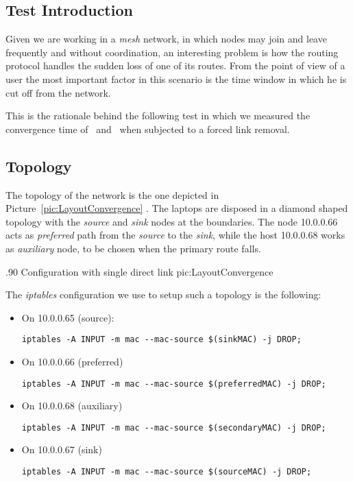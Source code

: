 \subsection{Test Introduction}
Given we are working in a \emph{mesh} network, in which nodes may join
and leave frequently and without coordination, an interesting problem
is how the routing protocol handles the sudden loss of one of its
routes. From the point of view of a user the most important factor in
this scenario is the time window in which he is cut off from the
network.

This is the rationale behind the following test in which we measured the
convergence time of \batman\ and \olsr\ when subjected to a forced
link removal.

\subsection{Topology}
 The topology of the network is the one depicted in
Picture~\ref{pic:LayoutConvergence} . The laptops are disposed in a
diamond shaped topology with the \emph{source} and \emph{sink} nodes
at the boundaries. The node 10.0.0.66 acts as \emph{preferred} path
from the \emph{source} to the \emph{sink}, while the host 10.0.0.68 works
as \emph{auxiliary} node, to be chosen when the primary route falls.

        {.90\columnwidth}
        {Configuration with single direct link}
        {pic:LayoutConvergence}

The \emph{iptables} configuration we use to setup such a topology is
the following:

\begin{itemize}
\item On 10.0.0.65 (source):

\begin{verbatim}
iptables -A INPUT -m mac --mac-source $(sinkMAC) -j DROP;
\end{verbatim}

\item On 10.0.0.66 (preferred)
\begin{verbatim}
iptables -A INPUT -m mac --mac-source $(preferredMAC) -j DROP;
\end{verbatim}

\item On 10.0.0.68 (auxiliary)
\begin{verbatim}
iptables -A INPUT -m mac --mac-source $(secondaryMAC) -j DROP;
\end{verbatim}

\item On 10.0.0.67 (sink)
\begin{verbatim}
iptables -A INPUT -m mac --mac-source $(sourceMAC) -j DROP;
\end{verbatim}
\end{itemize}

